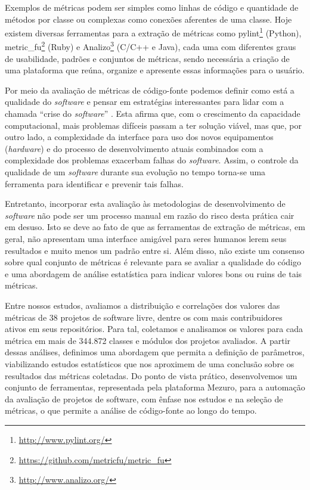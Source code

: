 \documentclass{llncs}
\begin{document}
Exemplos de métricas podem ser simples como linhas de código e quantidade de
métodos por classe ou complexas como conexões aferentes de uma classe. Hoje
existem diversas ferramentas para a extração de métricas como
pylint\footnote{\url{http://www.pylint.org/}} (Python),
metric\_fu\footnote{\url{https://github.com/metricfu/metric_fu}} (Ruby) e
Analizo\footnote{\url{http://www.analizo.org/}} (C/C++ e Java), cada uma com
diferentes graus de usabilidade, padrões e conjuntos de métricas, sendo
necessária a criação de uma plataforma que reúna, organize e apresente essas
informações para o usuário.

Por meio da avaliação de métricas de código-fonte podemos definir como está a
qualidade do \textit{software} e pensar em estratégias interessantes para lidar
com a chamada ``crise do \textit{software}'' \cite{naur1969software}. Esta
afirma que, com o crescimento da capacidade computacional, mais problemas
difíceis passam a ter solução viável, mas que, por outro lado, a complexidade
da interface para uso dos novos equipamentos (\textit{hardware}) e do processo
de desenvolvimento atuais combinados com a complexidade dos problemas exacerbam
falhas do \textit{software}. Assim, o controle da qualidade de um
\textit{software} durante sua evolução no tempo torna-se uma ferramenta para
identificar e prevenir tais falhas.

Entretanto, incorporar esta avaliação às metodologias de desenvolvimento de
\textit{software} não pode ser um processo manual em razão do risco desta
prática cair em desuso. Isto se deve ao fato de que as ferramentas de extração
de métricas, em geral, não apresentam uma interface amigável para seres humanos
lerem seus resultados e muito menos um padrão entre si. 
%
Além disso, não existe um consenso sobre qual conjunto de métricas é relevante para
se avaliar a qualidade do código e uma abordagem de análise estatística para indicar
valores bons ou ruins de tais métricas\cite{meirelles2013monitoramento}.

Entre nossos estudos, avaliamos a distribuição e correlações dos valores das
métricas de 38 projetos de software livre, dentre os com mais contribuidores
ativos em seus repositórios. Para tal, coletamos e analisamos os valores para
cada métrica em mais de 344.872 classes e módulos dos projetos
avaliados\cite{meirelles2013monitoramento}.
%
A partir dessas análises, definimos uma abordagem que permita a definição de
parâmetros, viabilizando estudos estatísticos que nos aproximem de uma
conclusão sobre os resultados das métricas coletadas.
%
Do ponto de vista prático, desenvolvemos um conjunto de ferramentas,
representada pela plataforma Mezuro, para a automação da avaliação de projetos
de software, com ênfase nos estudos e na seleção de métricas, o que
permite a análise de código-fonte ao longo do tempo.
\end{document}
